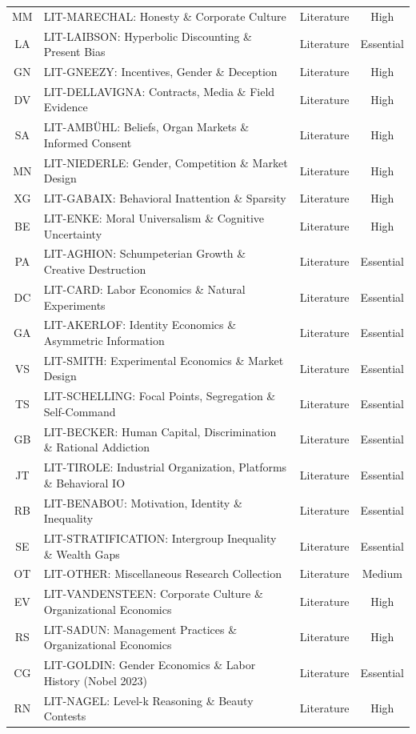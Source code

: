 \begin{table}[htbp]
\begin{tabular}{@{}cllc@{}}
MM & LIT-MARECHAL: Honesty \& Corporate Culture & Literature & High \\
LA & LIT-LAIBSON: Hyperbolic Discounting \& Present Bias & Literature & Essential \\
GN & LIT-GNEEZY: Incentives, Gender \& Deception & Literature & High \\
DV & LIT-DELLAVIGNA: Contracts, Media \& Field Evidence & Literature & High \\
SA & LIT-AMBÜHL: Beliefs, Organ Markets \& Informed Consent & Literature & High \\
MN & LIT-NIEDERLE: Gender, Competition \& Market Design & Literature & High \\
XG & LIT-GABAIX: Behavioral Inattention \& Sparsity & Literature & High \\
BE & LIT-ENKE: Moral Universalism \& Cognitive Uncertainty & Literature & High \\
PA & LIT-AGHION: Schumpeterian Growth \& Creative Destruction & Literature & Essential \\
DC & LIT-CARD: Labor Economics \& Natural Experiments & Literature & Essential \\
GA & LIT-AKERLOF: Identity Economics \& Asymmetric Information & Literature & Essential \\
VS & LIT-SMITH: Experimental Economics \& Market Design & Literature & Essential \\
TS & LIT-SCHELLING: Focal Points, Segregation \& Self-Command & Literature & Essential \\
GB & LIT-BECKER: Human Capital, Discrimination \& Rational Addiction & Literature & Essential \\
JT & LIT-TIROLE: Industrial Organization, Platforms \& Behavioral IO & Literature & Essential \\
RB & LIT-BENABOU: Motivation, Identity \& Inequality & Literature & Essential \\
SE & LIT-STRATIFICATION: Intergroup Inequality \& Wealth Gaps & Literature & Essential \\
OT & LIT-OTHER: Miscellaneous Research Collection & Literature & Medium \\
EV & LIT-VANDENSTEEN: Corporate Culture \& Organizational Economics & Literature & High \\
RS & LIT-SADUN: Management Practices \& Organizational Economics & Literature & High \\
CG & LIT-GOLDIN: Gender Economics \& Labor History (Nobel 2023) & Literature & Essential \\
RN & LIT-NAGEL: Level-k Reasoning \& Beauty Contests & Literature & High \\


\end{tabular}
\end{table}
